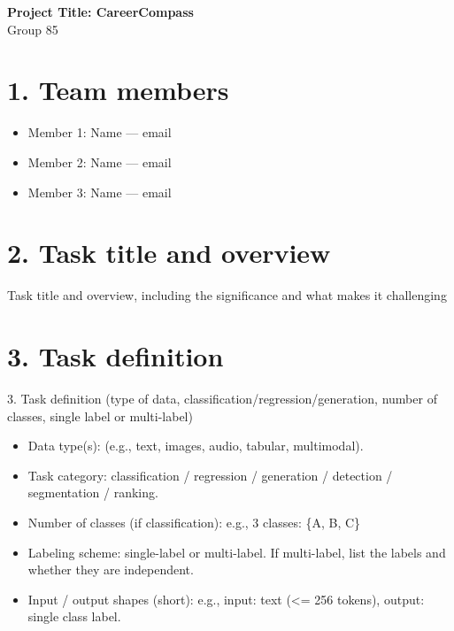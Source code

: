 \documentclass[12pt]{article}
\begin{document}
\begin{center}
  {\Large\bfseries Project Title: CareerCompass}\\[8pt]
  {\normalsize Group 85}
\end{center}

\section*{1. Team members}
\begin{itemize}
  \item Member 1: Name  — email
  \item Member 2: Name  — email
  \item Member 3: Name  — email
\end{itemize}

\section*{2. Task title and overview}
Task title and overview, including the significance and what makes it challenging 

\section*{3. Task definition}
3. Task definition (type of data, classification/regression/generation, number of classes, single label or multi-label) 
\begin{itemize}
  \item Data type(s): (e.g., text, images, audio, tabular, multimodal).
  \item Task category: classification / regression / generation / detection / segmentation / ranking.
  \item Number of classes (if classification): e.g., 3 classes: \{A, B, C\}
  \item Labeling scheme: single-label or multi-label. If multi-label, list the labels and whether they are independent.
  \item Input / output shapes (short): e.g., input: text (<= 256 tokens), output: single class label.
\end{itemize}
\end{document}
